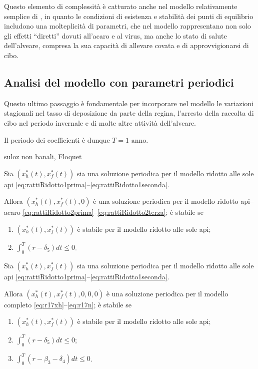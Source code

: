Questo elemento di complessità è catturato anche nel modello relativamente semplice di \cite{ratti2017}, in quanto le condizioni di esistenza e stabilità dei punti di equilibrio includono una molteplicità di parametri, che nel modello rappresentano non solo gli effetti ``diretti'' dovuti all'acaro e al virus, ma anche lo stato di salute dell'alveare, compresa la sua capacità di allevare covata e di approvvigionarsi di cibo.


\subsection{Analisi del modello con parametri periodici}
\label{sez:paramPeriodici}
Questo ultimo passaggio è fondamentale per incorporare nel modello le variazioni stagionali nel tasso di deposizione da parte della regina, l'arresto della raccolta di cibo nel periodo invernale e di molte altre attività dell'alveare.

Il periodo dei coefficienti è dunque $T= 1 \text{ anno}$.

suloz non banali, Floquet

\begin{proposizione}
    Sia $\left( x_h^*(t), x_f^*(t) \right)$ sia una soluzione periodica per il modello ridotto alle sole api \eqref{eq:rattiRidotto1prima}--\eqref{eq:rattiRidotto1seconda}.

    Allora $\left( x_h^*(t), x_f^*(t), 0 \right)$ è una soluzione periodica per il modello ridotto api--acaro \eqref{eq:rattiRidotto2prima}--\eqref{eq:rattiRidotto2terza}; è stabile se
    \begin{enumerate}
        \item $\left( x_h^*(t), x_f^*(t) \right)$ è stabile per il modello ridotto alle sole api;
        \item $\int_0^T (r - \delta_5) dt \leq 0$.
    \end{enumerate}
\end{proposizione}


\begin{proposizione}
    Sia $\left( x_h^*(t), x_f^*(t) \right)$ sia una soluzione periodica per il modello ridotto alle sole api \eqref{eq:rattiRidotto1prima}--\eqref{eq:rattiRidotto1seconda}.

    Allora $\left( x_h^*(t), x_f^*(t), 0, 0, 0 \right)$ è una soluzione periodica per il modello completo \eqref{eq:r17xh}--\eqref{eq:r17n}; è stabile se
    \begin{enumerate}
        \item $\left( x_h^*(t), x_f^*(t) \right)$ è stabile per il modello ridotto alle sole api;
        \item $\int_0^T (r - \delta_5) dt \leq 0$;
        \item $\int_0^T (r -\beta_3 - \delta_4) dt \leq 0$.
    \end{enumerate}
\end{proposizione}



